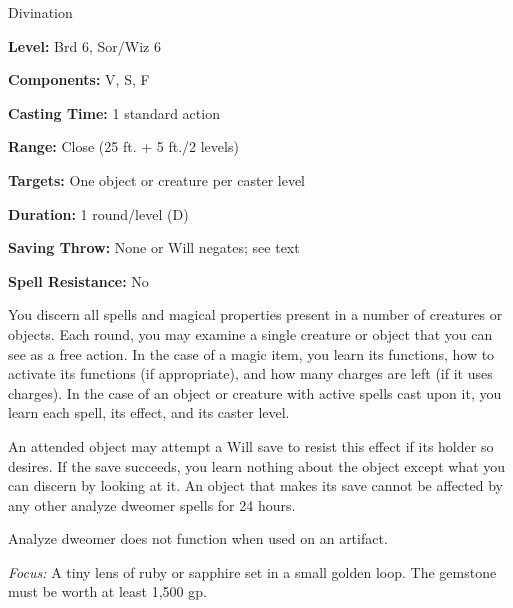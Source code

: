 
Divination

\textbf{Level:} Brd 6, Sor/Wiz 6

\textbf{Components:} V, S, F

\textbf{Casting Time:} 1 standard action

\textbf{Range:} Close (25 ft. + 5 ft./2 levels)

\textbf{Targets:} One object or creature per caster level

\textbf{Duration:} 1 round/level (D)

\textbf{Saving Throw:} None or Will negates; see text

\textbf{Spell Resistance:} No

You discern all spells and magical properties present in a number of creatures 
or objects. Each round, you may examine a single creature or object that you can 
see as a free action. In the case of a magic item, you learn its functions, how 
to activate its functions (if appropriate), and how many charges are left (if it 
uses charges). In the case of an object or creature with active spells cast upon 
it, you learn each spell, its effect, and its caster level.

An attended object may attempt a Will save to resist this effect if its holder 
so desires. If the save succeeds, you learn nothing about the object except what 
you can discern by looking at it. An object that makes its save cannot be affected 
by any other analyze dweomer spells for 24 hours.

Analyze dweomer does not function when used on an artifact.

\textit{Focus:} A tiny lens of ruby or sapphire set in a small golden loop. The 
gemstone must be worth at least 1,500 gp.

